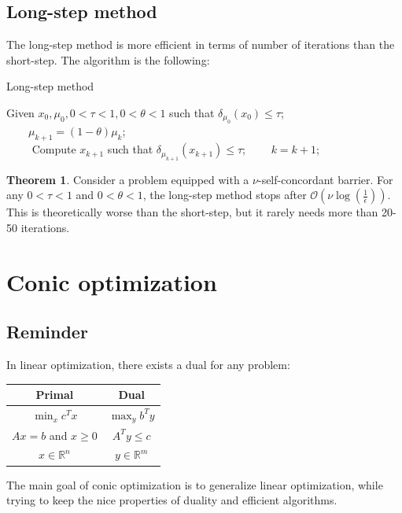\documentclass[12pt, openany]{report}
\newcommand{\R}{\mathbb{R}}
\theoremstyle{definition}
\newtheorem{thm}{Theorem}[chapter]
\begin{document}
\section{Long-step method}
The long-step method is more efficient in terms of number of iterations than the short-step. The algorithm is the following:
\begin{algorithm}
\begin{algorithmic}[1]
    \caption{Long-step method}\label{algo:long_step}
    \State Given $x_0,\mu_0, 0<\tau<1, 0<\theta<1$ such that $\delta_{\mu_0}(x_0)\le \tau$;
    \\
    $\qquad \mu_{k+1}=(1-\theta)\mu_k$;\\
    $\qquad$ Compute $x_{k+1}$ such that $\delta_{\mu_{k+1}}(x_{k+1})\le \tau$;
    \EndWhile
    $\qquad k=k+1$;
\end{algorithmic}
\end{algorithm}
\begin{thm}
Consider a problem equipped with a $\nu$-self-concordant barrier. For any $0<\tau<1$ and $0<\theta<1$, the long-step method stops after $\mathcal{O}(\nu \log(\frac{1}{\epsilon}))$. This is theoretically worse than the short-step, but it rarely needs more than 20-50 iterations. 
\end{thm}
\chapter{Conic optimization}
\section{Reminder}
In linear optimization, there exists a dual for any problem:
\begin{center}
    \begin{tabular}{c|c}
        Primal & Dual\\ \hline 
        $\min_x c^Tx$ & $\max_y b^Ty$\\
        $Ax=b$ and $x\ge 0$ & $A^Ty \le c$ \\ \hline 
        $x\in \R^n$ & $y\in \R^m$\\
    \end{tabular}    
\end{center}
The main goal of conic optimization is to generalize linear optimization, while trying to keep the nice properties of duality and efficient algorithms. \\
\end{document}
